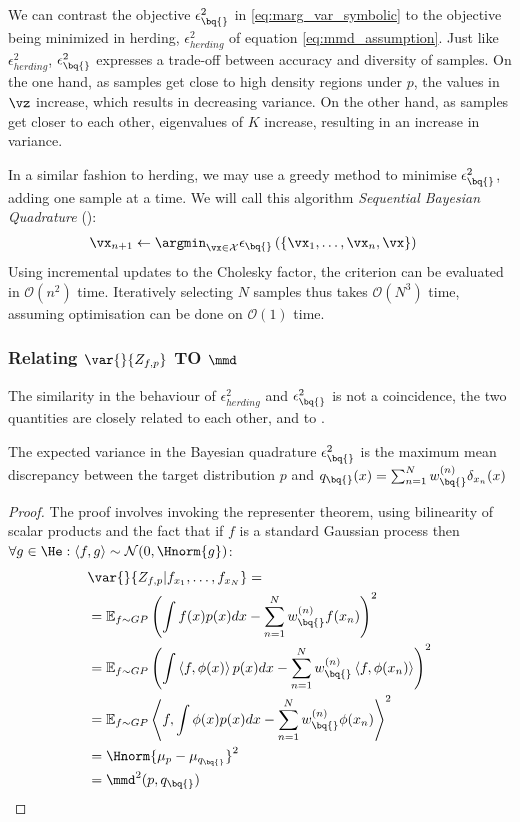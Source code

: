 We can contrast the \bq{} objective $\epsilon^{2}_{\bq{}}$ in \eqref{eq:marg_var_symbolic} to the objective being minimized in herding, $\epsilon^{2}_{herding}$ of equation \eqref{eq:mmd_assumption}. Just like $\epsilon^{2}_{herding}$, $\epsilon^{2}_{\bq{}}$ expresses a trade-off between accuracy and diversity of samples. On the one hand, as samples get close to high density regions under $p$, the values in $\vz$ increase, which results in decreasing variance. On the other hand, as samples get closer to each other, eigenvalues of $K$ increase, resulting in an increase in variance. 

In a similar fashion to herding, we may use a greedy method to minimise $\epsilon^{2}_{\bq{}}$, adding one sample at a time. We will call this algorithm \emph{Sequential Bayesian Quadrature} (\sbq{}):
\begin{align}
\vx_{n+1} &\leftarrow \argmin_{\vx \in \mathcal{X}} \epsilon_{\bq{}}\left(\{\vx_1,\ldots,\vx_{n},\vx\}\right)
\end{align}
Using incremental updates to the Cholesky factor, the criterion can be evaluated in $\mathcal{O}(n^2)$ time. Iteratively selecting $N$ samples thus takes $\mathcal{O}(N^3)$ time, assuming optimisation can be done on $\mathcal{O}(1)$ time.

\subsubsection{Relating $\var{}{Z_{f,p}}$ TO $\mmd$}

The similarity in the behaviour of $\epsilon^{2}_{herding}$ and $\epsilon^{2}_{\bq{}}$ is not a coincidence, the two quantities are closely related to each other, and to \mmd.

\begin{proposition} The expected variance in the Bayesian quadrature $\epsilon^{2}_{\bq{}}$  is the maximum mean discrepancy between the target distribution $p$ and $q_{\bq{}}(x) = \sum_{n=1}^{N}w^{(n)}_{\bq{}}\delta_{x_n}(x)$
\end{proposition}
%
\begin{proof}
The proof involves invoking the representer theorem, using bilinearity of scalar products and the fact that if $f$ is a standard Gaussian process then $\forall g\in\He: \left\langle f,g\right\rangle \sim \mathcal{N}(0,\Hnorm{g})$:
\begin{align}
&\var{}{Z_{f,p}\vert f_{x_1}, \dots, f_{x_N}}=\\
	&= \mathbb{E}_{f\sim GP} \left( \int f(x) p(x) dx - \sum_{n=1}^{N}w^{(n)}_{\bq{}} f(x_n)\right)^2\\
	&= \mathbb{E}_{f\sim GP} \left( \int \left\langle f, \phi (x)\right\rangle p(x) dx - \sum_{n=1}^{N}w^{(n)}_{\bq{}} \left\langle f, \phi (x_n)\right\rangle\right)^2\\
	&= \mathbb{E}_{f\sim GP} \left\langle f ,  \int\phi(x) p(x) dx - \sum_{n=1}^{N}w^{(n)}_{\bq{}}\phi(x_n)\right\rangle^2\\
	&= \Hnorm{\mu_p - \mu_{q_{\bq{}}}}^2\\
	&= \mmd^2(p,q_{\bq{}})
\end{align}
\end{proof}


